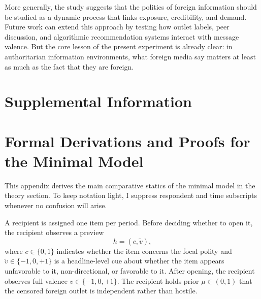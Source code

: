 \documentclass[12pt,american]{article}
\begin{document}
	More generally, the study suggests that the politics of foreign information should be studied as a dynamic process that links exposure, credibility, and demand. Future work can extend this approach by testing how outlet labels, peer discussion, and algorithmic recommendation systems interact with message valence. But the core lesson of the present experiment is already clear: in authoritarian information environments, what foreign media say matters at least as much as the fact that they are foreign.
	
	\clearpage
	\begingroup
	\doublespacing
	\setlength\bibitemsep{0pt}
	\printbibliography
	\endgroup
	
	\newpage
	\begin{refsection}
		
		\appendix
		\section*{Supplemental Information}
		\onehalfspacing
		\startcontents[sections]
		\thispagestyle{empty}
		
		\newpage
		\singlespacing
		\hypersetup{pageanchor=false}
		\renewcommand{\thepage}{SI-\arabic{page}}
		\setcounter{page}{1}
		\setcounter{figure}{0}
		\setcounter{table}{0}
		\setcounter{footnote}{0}
		
		\section{Formal Derivations and Proofs for the Minimal Model}
		\label{app:formal_proofs}
		
		This appendix derives the main comparative statics of the minimal model in the theory section. To keep notation light, I suppress respondent and time subscripts whenever no confusion will arise.
		
		A recipient is assigned one item per period. Before deciding whether to open it, the recipient observes a preview
		\[
		h=(c,\tilde v),
		\]
		where \(c\in\{0,1\}\) indicates whether the item concerns the focal polity and \(\tilde v\in\{-1,0,+1\}\) is a headline-level cue about whether the item appears unfavorable to it, non-directional, or favorable to it. After opening, the recipient observes full valence \(v\in\{-1,0,+1\}\). The recipient holds prior \(\mu\in(0,1)\) that the censored foreign outlet is independent rather than hostile.
		

\end{refsection}
\end{document}
